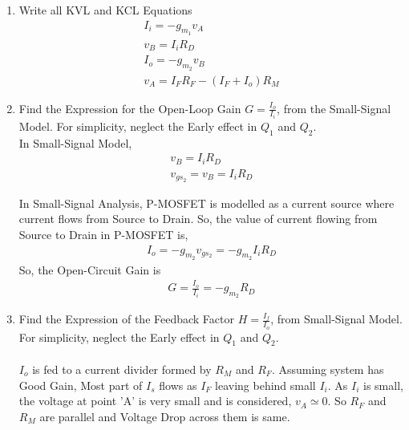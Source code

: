 \begin{enumerate}[label=\thesubsection.\arabic*.,ref=\thesubsection.\theenumi]
\item Write all KVL and KCL Equations\\
\solution
\begin{align}
I_{i} = -g_{m_{1}}v_{A}\\
v_{B} = I_{i}R_{D}\\
I_{o} = -g_{m_{2}}v_{B}\\
v_{A} = I_{F}R_{F} - (I_{F} + I_{o})R_{M}
\end{align}

\item Find the Expression for the Open-Loop Gain $G=\frac{I_{o}}{I_{i}}$, from the Small-Signal Model. For simplicity, neglect the Early effect in $Q_{1}$ and $Q_{2}$.\\
\solution
In Small-Signal Model,
\begin{align}
v_{B} = I_{i}R_{D}\\
v_{gs_{2}} = v_{B} = I_{i}R_{D}
\end{align}

In Small-Signal Analysis, P-MOSFET is modelled as a current source where current flows from Source to Drain. So, the value of current flowing from Source to Drain in P-MOSFET is,
\begin{align}
I_{o} =  -g_{m_{2}}v_{gs_{2}} = -g_{m_{2}}I_{i}R_{D}
\end{align}
So, the Open-Circuit Gain is
\begin{align}
G = \frac{I_{o}}{I_{i}} =  -g_{m_{2}}R_{D}
\end{align}

\item Find the Expression of the Feedback Factor $H = \frac{I_{f}}{I_{o}}$, from Small-Signal Model. For simplicity, neglect the Early effect in $Q_{1}$ and $Q_{2}$.\\
\solution\\
$I_{o}$ is fed to a current divider formed by $R_{M}$ and $R_{F}$. Assuming system has Good Gain, Most part of $I_{s}$ flows as $I_{F}$ leaving behind small $I_{i}$. As $I_{i}$ is small, the voltage at point 'A' is very small and is considered, $v_{A} \simeq 0$. So $R_{F}$ and $R_{M}$ are parallel and Voltage Drop across them is same.


\end{enumerate}
